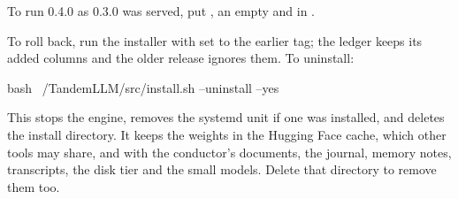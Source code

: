 To run 0.4.0 as 0.3.0 was served, put , an empty  and  in .

To roll back, run the installer with  set to the earlier tag; the ledger keeps its added columns and the older release ignores them. To uninstall:

\begin{shell}
bash ~/TandemLLM/src/install.sh --uninstall --yes
\end{shell}

This stops the engine, removes the systemd unit if one was installed, and deletes the install directory. It keeps the weights in the Hugging Face cache, which other tools may share, and  with the conductor's documents, the journal, memory notes, transcripts, the disk tier and the small models. Delete that directory to remove them too.

